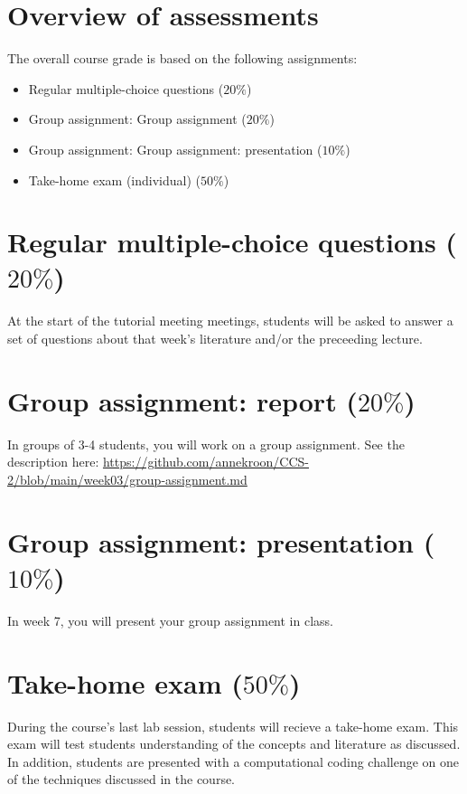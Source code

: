 \documentclass[a4paper,10pt,twocolumn]{report}
\begin{document}
	\section{Overview of assessments}
	The overall course grade is based on the following assignments:
	\begin{itemize}
		\item Regular multiple-choice questions (\(20\%\))
		\item Group assignment: Group assignment (\(20\%\))
		\item Group assignment: Group assignment: presentation (\(10\%\))
		\item Take-home exam (individual) (\(50\%\))
	\end{itemize}

	
	\section{Regular multiple-choice questions ($20\%$)}
At the start of the tutorial meeting meetings, students will be asked to answer a set of questions about that week's literature and/or the preceeding lecture. 
	
	\section{Group assignment: report ($20\%$)}
In groups of 3-4 students, you will work on a group assignment. See the description here: \url{https://github.com/annekroon/CCS-2/blob/main/week03/group-assignment.md}
	
	\section{Group assignment: presentation ($10\%$)}
In week 7, you will present your group assignment in class. 
	
	\section{Take-home exam ($50\%$)}
	During the course's last lab session, students will recieve a take-home exam. This exam will test students understanding of the concepts and literature as discussed. In addition, students are presented with a computational coding challenge on one of the techniques discussed in the course. 
\end{document}
